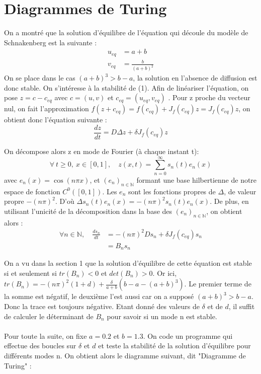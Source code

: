 \documentclass[12pt,a4paper]{article}
\begin{document}
\section{Diagrammes de Turing}

On a montré que la solution d'équilibre de l'équation qui découle du modèle de Schnakenberg est la suivante :
\begin{equation}
\begin{split}
    u_{eq} & = a + b \\
    v_{eq} & = \frac{b}{(a+b)^{2}}
\end{split}
\end{equation}
On se place dans le cas $(a+b)^{3} > b-a$, la solution en l'absence de diffusion est donc stable. On s'intéresse à la stabilité de (1).
Afin de linéariser l'équation, on pose $z = c - c_{eq}$ avec $c = (u,v)$ et $c_{eq} = (u_{eq},v_{eq})$ . Pour z proche du vecteur nul, on fait l'approximation $f(z+c_{eq}) = f(c_{eq}) + J_{f}(c_{eq})z = J_{f}(c_{eq})z $, on obtient donc l'équation suivante :
\begin{equation}
    \frac{dz}{dt} = D\Delta z + \delta J_{f}(c_{eq})z
\end{equation}

On décompose alors z en mode de Fourier (à chaque instant t):
\begin{equation}
    \forall \  t\geq 0 ,\ x \in [0,1], \quad  z(x,t) = \sum_{n=0}^{\infty} s_{n}(t)e_{n}(x)
\end{equation}
avec $e_{n}(x) = \cos(n \pi x)$, et $(e_{n})_{n \in \mathbb{N}}$ formant une base hilbertienne de notre espace de fonction $C^{0}([0,1])$. Les $e_{n}$ sont les fonctions propres de $\Delta$, de valeur propre $-(n\pi)^{2}$. D'où $\Delta s_{n}(t) e_{n}(x) = -(n \pi)^{2} s_{n}(t) e_{n}(x)$. De plus, en utilisant l'unicité de la décomposition dans la base des $(e_{n})_{n \in \mathbb{N}}$, on obtient alors :
\begin{equation}
\begin{split}
    \forall n \in \mathbb{N}, \quad \frac{d s_{n}}{dt} & = -(n \pi)^{2}D s_{n} + \delta J_{f}(c_{eq}) s_{n} \\
    & = B_{n} s_{n}
\end{split}
\end{equation}

On a vu dans la section 1 que la solution d'équilibre de cette équation est stable si et seulement si $tr(B_{n}) < 0$ et $det(B_{n}) > 0$. Or ici, $tr(B_{n})  = -(n \pi)^{2}(1+d) + \frac{\delta}{a+b} (b-a-(a+b)^{3})$. Le premier terme de la somme est négatif, le deuxième l'est aussi car on a supposé $(a+b)^{3} > b-a$. Donc la trace est toujours négative.
Etant donné des valeurs de $\delta$ et de $d$, il suffit de calculer le déterminant de $B_{n}$ pour savoir si un mode n est stable. \\ \\
Pour toute la suite, on fixe $a = 0.2$ et $b = 1.3$. On code un programme qui effectue des boucles sur $\delta$ et $d$ et teste la stabilité de la solution d'équilibre pour différents modes n. On obtient alors le diagramme suivant, dit "Diagramme de Turing" :
\end{document}
